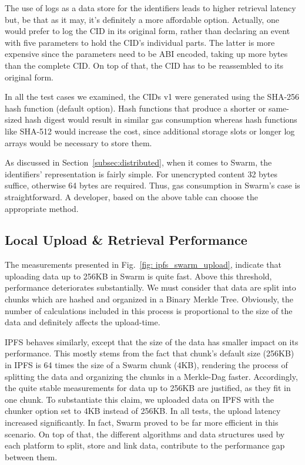 The use of logs as a data store for the identifiers leads to higher retrieval latency but, be that as it may, it’s definitely a more affordable option. Actually, one would prefer to log the CID in its original form, rather than declaring an event with five parameters to hold the CID’s individual parts. The latter is more expensive since the parameters need to be ABI encoded, taking up more bytes than the complete CID. On top of that, the CID has to be reassembled to its original form.

In all the test cases we examined, the CIDs v1 were generated using the SHA-256 hash function (default option). Hash functions that produce a shorter or same-sized hash digest would result in similar gas consumption whereas hash functions like SHA-512 would increase the cost, since additional storage slots or longer log arrays would be necessary to store them.

As discussed in Section~\ref{subsec:distributed}, when it comes to Swarm, the identifiers’ representation is fairly simple. For unencrypted content 32 bytes suffice, otherwise 64 bytes are required. Thus, gas consumption in Swarm’s case is straightforward. A developer, based on the above table can choose the appropriate method.
\subsection{Local Upload \& Retrieval Performance}\label{subsection:evaluation_local}
The measurements presented in Fig.~\ref{fig: ipfs_swarm_upload}, indicate that uploading data up to 256KB in Swarm is quite fast. Above this threshold, performance deteriorates substantially. We must consider that data are split into chunks which are hashed and organized in a Binary Merkle Tree. Obviously, the number of calculations included in this process is proportional to the size of the data and definitely affects the upload-time.

IPFS behaves similarly, except that the size of the data has smaller impact on its performance. This mostly stems from the fact that chunk’s default size (256KB) in IPFS is 64 times the size of a Swarm chunk (4KB), rendering the process of splitting the data and organizing the chunks in a Merkle-Dag faster. Accordingly, the quite stable measurements for data up to 256KB are justified, as they fit in one chunk. To substantiate this claim, we uploaded data on IPFS with the chunker option set to 4KB instead of 256KB. In all tests, the upload latency increased significantly. In fact, Swarm proved to be far more efficient in this scenario. On top of that, the different algorithms and data structures used by each platform to split, store and link data, contribute to the performance gap between them.

